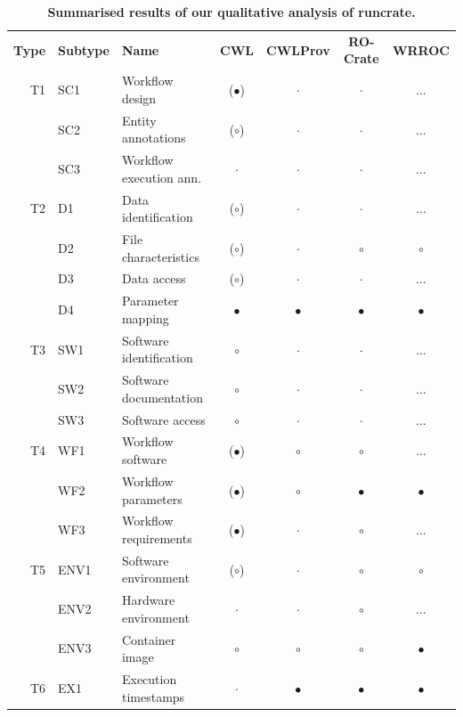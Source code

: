 \documentclass[10pt,letterpaper]{article}
\newlength\savedwidth
\newcommand\thickhline{\noalign{\global\savedwidth\arrayrulewidth\global\arrayrulewidth 2pt}%
\hline
\noalign{\global\arrayrulewidth\savedwidth}}
\begin{document}
\begin{table}[!ht]
\begin{adjustwidth}{-1.4cm}{0in} %
\centering
\caption{
{\bf Summarised results of our qualitative analysis of runcrate.}}
\begin{tabular}{r|l|l|c|c|c|c}
\hline
{\bf Type} & {\bf Subtype}      & {\bf Name} & {\bf CWL} & {\bf CWLProv} & {\bf RO-Crate} & {\bf WRROC}  \\ \thickhline
T1 & SC1 & Workflow design      & ($\bullet$) &  $\cdot$ & $\cdot$ & $\dots$ \\ 
& SC2 & Entity annotations      & ($\circ$) &  $\cdot$ &  $\cdot$  & $\dots$ \\ 
& SC3 & Workflow execution ann. &  $\cdot$  & $\cdot$ &  $\cdot$ & $\dots$ \\ \hline
T2 & D1 & Data identification   & ($\circ$) & $\cdot$ &  $\cdot$ & $\dots$ \\
& D2 & File characteristics     & ($\circ$) & $\cdot$ & $\circ$ & $\circ$ \\
& D3 & Data access              & ($\circ$) &  $\cdot$ &  $\cdot$  & $\dots$ \\ 
& D4 & Parameter mapping        & $\bullet$ & $\bullet$ & $\bullet$ & $\bullet$ \\ \hline 
T3 & SW1 & Software identification & $\circ$ &  $\cdot$ & $\cdot$ & $\dots$ \\ 
& SW2 & Software documentation  & $\circ$ &  $\cdot$ & $\cdot$ & $\dots$ \\  
& SW3 & Software access         & $\circ$ &  $\cdot$ & $\cdot$ & $\dots$ \\ \hline 
T4 & WF1 & Workflow software    & ($\bullet$) & $\circ$ & $\circ$ & $\dots$ \\ 
& WF2 & Workflow parameters     & ($\bullet$) & $\circ$ & $\bullet$ & $\bullet$ \\ 
& WF3 & Workflow requirements   & ($\bullet$) &  $\cdot$  &  $\circ$  & $\dots$ \\ \hline 
T5 & ENV1 & Software environment & ($\circ$) & $\cdot$ &  $\circ$ & $\circ$ \\ 
& ENV2 & Hardware environment   & $\cdot$ & $\cdot$ &  $\circ$  & $\dots$\\ 
& ENV3 & Container image        & $\circ$ & $\circ$ &  $\circ$ & $\bullet$ \\ \hline 
T6 & EX1 & Execution timestamps & $\cdot$ & $\bullet$ & $\bullet$ & $\bullet$ \\ 

\end{tabular}
\end{adjustwidth}
\end{table}
\end{document}
